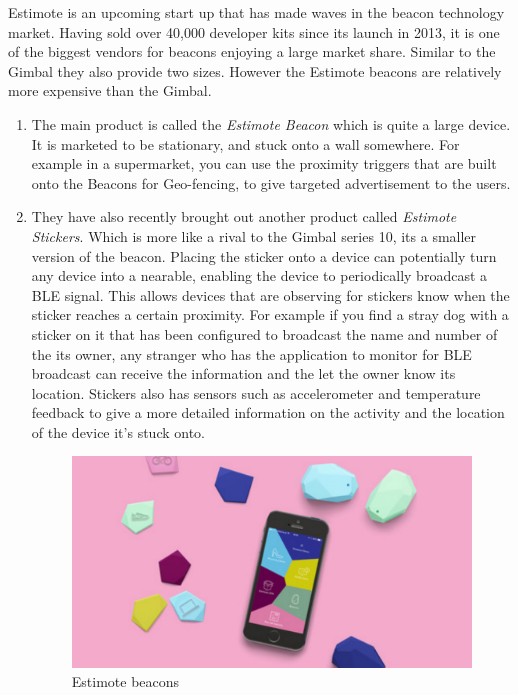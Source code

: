 Estimote\cite{estimote} is an upcoming start up that has made waves
in the beacon technology market. Having sold over 40,000 developer
kits since its launch in 2013, it is one of the biggest vendors for
beacons enjoying a large market share. Similar to the Gimbal they
also provide two sizes. However the Estimote beacons are relatively
more expensive than the Gimbal.
\begin{enumerate}
\item The main product is called the \emph{Estimote Beacon} which is quite a large
device. It is marketed to be stationary, and stuck onto a wall somewhere. For example in a supermarket, you can use the proximity triggers that are built onto the Beacons for Geo-fencing, to give targeted advertisement to the users.  
\item They have also recently brought out another product called \emph{Estimote
Stickers}. Which is more like a rival to the Gimbal series 10, its
a smaller version of the beacon. Placing the sticker onto a device can potentially turn any device
into a nearable, enabling the device to periodically broadcast a BLE signal. This allows devices that are observing for stickers know when the sticker reaches a certain proximity. For example if you find a stray dog with a sticker on it that has been configured to broadcast the name and number of the its owner, any stranger who has the application to monitor for BLE broadcast can receive the information and the let the owner know its location. Stickers also has sensors such as accelerometer and
temperature feedback to give a more detailed information on the activity and
the location of the device it's stuck onto.
\begin{figure}[H]
\centering
\includegraphics[scale=0.3]{images/estimote}

\protect\caption{Estimote beacons}


\end{figure}

\end{enumerate}

